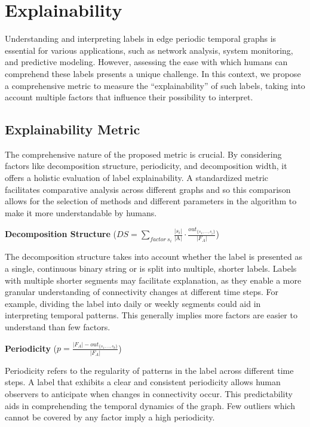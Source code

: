 \chapter{Explainability}

Understanding and interpreting labels in edge periodic temporal graphs is essential for various applications, such as network analysis, system monitoring, and predictive modeling. However, assessing the ease with which humans can comprehend these labels presents a unique challenge. In this context, we propose a comprehensive metric to measure the \enquote{explainability} of such labels, taking into account multiple factors that influence their possibility to interpret. 

\section{Explainability Metric}
The comprehensive nature of the proposed metric is crucial. By considering factors like decomposition structure, periodicity, and decomposition width, it offers a holistic evaluation of label explainability. A standardized metric facilitates comparative analysis across different graphs and so this comparison allows for the selection of methods and different parameters in the algorithm to make it more understandable by humans.

\textbf{Decomposition Structure} ($DS = \sum\limits_{factor~ s_i}\frac{|s_i|}{\text{|A|}} \cdot \frac{out_{\{s_1,\dots,s_i\}}}{|F_A|}$)

The decomposition structure takes into account whether the label is presented as a single, continuous binary string or is split into multiple, shorter labels. Labels with multiple shorter segments may facilitate explanation, as they enable a more granular understanding of connectivity changes at different time steps. For example, dividing the label into daily or weekly segments could aid in interpreting temporal patterns. This generally implies more factors are easier to understand than few factors.

\textbf{Periodicity} ($p = \frac{|F_A| - out_{\{s_1,\dots,s_k\}}}{|F_A|}$)

Periodicity refers to the regularity of patterns in the label across different time steps. A label that exhibits a clear and consistent periodicity allows human observers to anticipate when changes in connectivity occur. This predictability aids in comprehending the temporal dynamics of the graph. Few outliers which cannot be covered by any factor imply a high periodicity.

